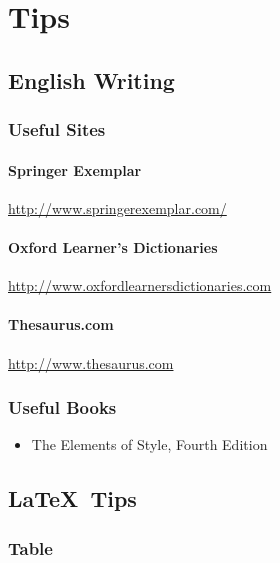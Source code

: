 \chapter{Tips} \label{chapter:tips}

\graphicspath{{Manuscript/Figs/}}

\section{English Writing}

\subsection{Useful Sites}

\subsubsection{Springer Exemplar}
\url{http://www.springerexemplar.com/}

\subsubsection{Oxford Learner's Dictionaries}
\url{http://www.oxfordlearnersdictionaries.com}

\subsubsection{Thesaurus.com}
\url{http://www.thesaurus.com}


\subsection{Useful Books}

\begin{itemize}
	\item The Elements of Style, Fourth Edition~\cite{strunk1979}
\end{itemize}

\section{\LaTeX ~Tips}

\subsection{Table} \label{sec:table}


